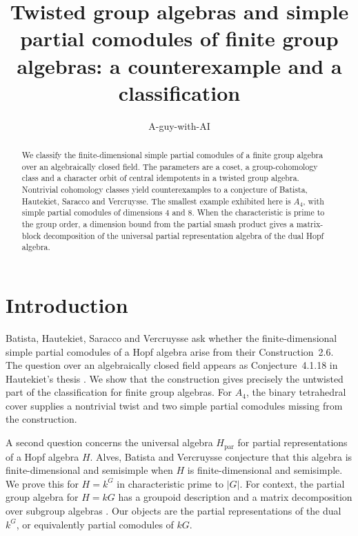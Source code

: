 \documentclass[11pt]{amsart}
\title[Twisted group algebras and partial comodules]{Twisted group algebras and simple partial comodules of finite group algebras: a counterexample and a classification}
\author{A-guy-with-AI}
\theoremstyle{definition}
\newcommand{\paralg}{H_{\mathrm{par}}}
\begin{document}
\begin{abstract}
We classify the finite-dimensional simple partial comodules of a finite group algebra over an algebraically closed field. The parameters are a coset, a group-cohomology class and a character orbit of central idempotents in a twisted group algebra. Nontrivial cohomology classes yield counterexamples to a conjecture of Batista, Hautekiet, Saracco and Vercruysse. The smallest example exhibited here is $A_4$, with simple partial comodules of dimensions $4$ and $8$. When the characteristic is prime to the group order, a dimension bound from the partial smash product gives a matrix-block decomposition of the universal partial representation algebra of the dual Hopf algebra.
\end{abstract}
\maketitle

\section{Introduction}
Batista, Hautekiet, Saracco and Vercruysse \cite[Conjecture~B]{BHSV} ask whether the finite-dimensional simple partial comodules of a Hopf algebra arise from their Construction~2.6. The question over an algebraically closed field appears as Conjecture~4.1.18 in Hautekiet's thesis \cite{H}. We show that the construction gives precisely the untwisted part of the classification for finite group algebras. For $A_4$, the binary tetrahedral cover supplies a nontrivial twist and two simple partial comodules missing from the construction.

A second question concerns the universal algebra $\paralg$ for partial representations of a Hopf algebra $H$. Alves, Batista and Vercruysse \cite[Conjecture~2.8]{ABV19} conjecture that this algebra is finite-dimensional and semisimple when $H$ is finite-dimensional and semisimple. We prove this for $H=k^G$ in characteristic prime to $|G|$. For context, the partial group algebra for $H=kG$ has a groupoid description and a matrix decomposition over subgroup algebras \cite{DEP}. Our objects are the partial representations of the dual $k^G$, or equivalently partial comodules of $kG$.
\end{document}
